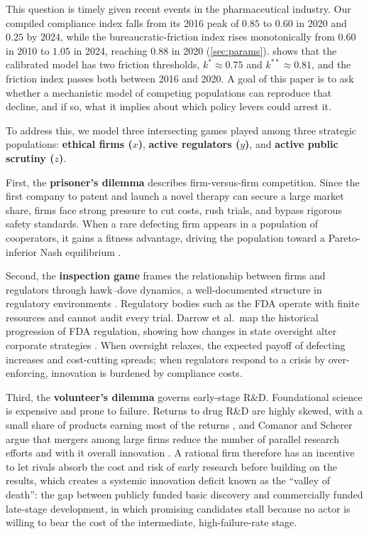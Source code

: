 \documentclass[10pt]{article}
\begin{document}
This question is timely given recent events in the pharmaceutical industry. Our compiled compliance index falls from its 2016 peak of $0.85$ to $0.60$ in 2020 and $0.25$ by 2024, while the bureaucratic-friction index rises monotonically from $0.60$ in 2010 to $1.05$ in 2024, reaching $0.88$ in 2020 (\cref{sec:params}).  shows that the calibrated model has two friction thresholds, $k^*\approx0.75$ and $k^{**}\approx0.81$, and the friction index passes both between 2016 and 2020. A goal of this paper is to ask whether a mechanistic model of competing populations can reproduce that decline, and if so, what it implies about which policy levers could arrest it.

To address this, we model three intersecting games played among three strategic populations: \textbf{ethical firms ($x$)}, \textbf{active regulators ($y$)}, and \textbf{active public scrutiny ($z$)}.

First, the \textbf{prisoner's dilemma} describes firm-versus-firm competition. Since the first company to patent and launch a novel therapy can secure a large market share, firms face strong pressure to cut costs, rush trials, and bypass rigorous safety standards. When a rare defecting firm appears in a population of cooperators, it gains a fitness advantage, driving the population toward a Pareto-inferior Nash equilibrium \cite{axelrod1984}.

Second, the \textbf{inspection game} frames the relationship between firms and regulators through hawk--dove dynamics, a well-documented structure in regulatory environments \cite{avenhaus2002}. Regulatory bodies such as the FDA operate with finite resources and cannot audit every trial. Darrow et al.\ map the historical progression of FDA regulation, showing how changes in state oversight alter corporate strategies \cite{darrow2020}. When oversight relaxes, the expected payoff of defecting increases and cost-cutting spreads; when regulators respond to a crisis by over-enforcing, innovation is burdened by compliance costs.

Third, the \textbf{volunteer's dilemma} governs early-stage R\&D. Foundational science is expensive and prone to failure. Returns to drug R\&D are highly skewed, with a small share of products earning most of the returns \cite{grabowski2002}, and Comanor and Scherer argue that mergers among large firms reduce the number of parallel research efforts and with it overall innovation \cite{comanor2013}. A rational firm therefore has an incentive to let rivals absorb the cost and risk of early research before building on the results, which creates a systemic innovation deficit known as the ``valley of death'': the gap between publicly funded basic discovery and commercially funded late-stage development, in which promising candidates stall because no actor is willing to bear the cost of the intermediate, high-failure-rate stage.
\end{document}
